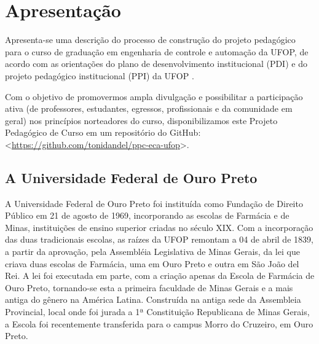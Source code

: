 \chapter{Apresenta{\c c}{\~a}o} 
\label{cap:introducao} 
Apresenta-se uma descri{\c c}{\~a}o do processo de constru{\c c}{\~a}o do projeto pedag{\'o}gico para o curso de gradua{\c c}{\~a}o em engenharia de controle e automa{\c c}{\~a}o da UFOP, de acordo com as orienta{\c c}{\~o}es do plano de desenvolvimento institucional (PDI) e do projeto pedagógico institucional (PPI) da UFOP \cite{manual-ppc-ufop}. 

Com o objetivo de promovermos ampla divulgação e possibilitar a participação ativa (de professores, estudantes, egressos, profissionais e da comunidade em geral) nos princípios norteadores do curso, disponibilizamos este Projeto Pedagógico de Curso em um repositório do GitHub: <\url{https://github.com/tonidandel/ppc-eca-ufop}>.
\section{A Universidade Federal de Ouro Preto}\label{sec:contextualizacao}
A Universidade Federal de Ouro Preto foi instituída como Fundação de Direito Público em 21 de agosto de 1969, incorporando as escolas de Farmácia e de Minas, instituições de ensino superior criadas no século XIX. Com a incorporação das duas tradicionais escolas, as raízes da UFOP remontam a 04 de abril de 1839, a partir da aprovação, pela Assembléia Legislativa de Minas Gerais, da lei que criava duas escolas de Farmácia, uma em Ouro Preto e outra em São João del Rei. A lei foi executada em parte, com a criação apenas da Escola de Farmácia de Ouro Preto, tornando-se esta a primeira faculdade de Minas Gerais e a mais antiga do gênero na América Latina. Construída na antiga sede da Assembleia Provincial, local onde foi jurada a 1ª Constituição Republicana de Minas Gerais, a Escola foi recentemente transferida para o campus Morro do Cruzeiro, em Ouro Preto.

